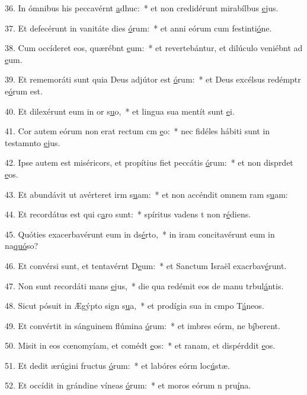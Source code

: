 36. In ómnibus his peccavérnt \uline{a}dhuc:~* et non credidérunt mirabílbus \uline{e}jus.\par 
37. Et defecérunt in vanitáte dies \uline{ó}rum:~* et anni eórum cum festinti\uline{ó}ne.\par 
38. Cum occíderet eos, quærébnt \uline{e}um:~* et revertebántur, et dilúculo veniébnt ad \uline{e}um.\par 
39. Et rememoráti sunt quia Deus adjútor est \uline{ó}rum:~* et Deus excélsus redémptr e\uline{ó}rum est.\par 
40. Et dilexérunt eum in or s\uline{u}o,~* et lingua sua mentít sunt \uline{e}i.\par 
41. Cor autem eórum non erat rectum cm \uline{e}o:~* nec fidéles hábiti sunt in testamnto \uline{e}jus.\par 
42. Ipse autem est miséricors, et propítius fiet peccátis \uline{ó}rum:~* et non disprdet \uline{e}os.\par 
43. Et abundávit ut avérteret irm s\uline{u}am:~* et non accéndit omnem ram s\uline{u}am:\par 
44. Et recordátus est qui c\uline{a}ro sunt:~* spíritus vadens t non r\uline{é}diens.\par 
45. Quóties exacerbavérunt eum in ds\uline{é}rto,~* in iram concitavérunt eum in na\uline{quó}so?\par 
46. Et convérsi sunt, et tentavérnt D\uline{e}um:~* et Sanctum Israël exacrbav\uline{é}runt.\par 
47. Non sunt recordáti mans \uline{e}jus,~* die qua redémit eos de manu trbul\uline{á}ntis.\par 
48. Sicut pósuit in Ægýpto sign s\uline{u}a,~* et prodígia sua in cmpo T\uline{á}neos.\par 
49. Et convértit in sánguinem flúmina \uline{ó}rum:~* et imbres eórm, ne b\uline{í}berent.\par 
50. Misit in eos cœnomyíam, et comédt \uline{e}os:~* et ranam, et dispérddit \uline{e}os.\par 
51. Et dedit ærúgini fructus \uline{ó}rum:~* et labóres eórm loc\uline{ú}stæ.\par 
52. Et occídit in grándine víneas \uline{ó}rum:~* et moros eórum n pru\uline{í}na.\par 
